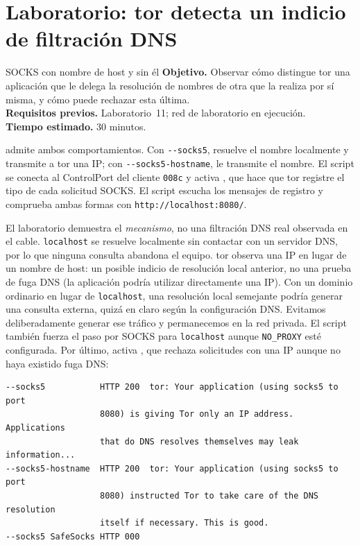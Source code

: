 \section{Laboratorio: tor detecta un indicio de filtración DNS}\label{sec:lab-opsec}

\begin{laboratorio}[18]{SOCKS con nombre de host y sin él}
\textbf{Objetivo.} Observar cómo distingue tor una aplicación que le delega la resolución de nombres de otra que la realiza por sí misma, y cómo puede rechazar esta última.\\
\textbf{Requisitos previos.} Laboratorio~11; red de laboratorio en ejecución.\\
\textbf{Tiempo estimado.} 30 minutos.
\end{laboratorio}

 admite ambos comportamientos. Con \texttt{-{}-socks5}, resuelve el nombre localmente y transmite a tor una IP; con \texttt{-{}-socks5-hostname}, le transmite el nombre. El script  se conecta al ControlPort del cliente \texttt{008c} y activa , que hace que tor registre el tipo de cada solicitud SOCKS. El script escucha los mensajes de registro y comprueba ambas formas con \texttt{http://localhost:8080/}.

El laboratorio demuestra el \emph{mecanismo}, no una filtración DNS real observada en el cable. \texttt{localhost} se resuelve localmente sin contactar con un servidor DNS, por lo que ninguna consulta abandona el equipo. tor observa una IP en lugar de un nombre de host: un posible indicio de resolución local anterior, no una prueba de fuga DNS (la aplicación podría utilizar directamente una IP). Con un dominio ordinario en lugar de \texttt{localhost}, una resolución local semejante podría generar una consulta externa, quizá en claro según la configuración DNS. Evitamos deliberadamente generar ese tráfico y permanecemos en la red privada. El script también fuerza el paso por SOCKS para \texttt{localhost} aunque \texttt{NO\_PROXY} esté configurada. Por último, activa , que rechaza solicitudes con una IP aunque no haya existido fuga DNS:

\begin{lstlisting}[numbers=none]
--socks5           HTTP 200  tor: Your application (using socks5 to port
                   8080) is giving Tor only an IP address. Applications
                   that do DNS resolves themselves may leak information...
--socks5-hostname  HTTP 200  tor: Your application (using socks5 to port
                   8080) instructed Tor to take care of the DNS resolution
                   itself if necessary. This is good.
--socks5 SafeSocks HTTP 000
\end{lstlisting}


